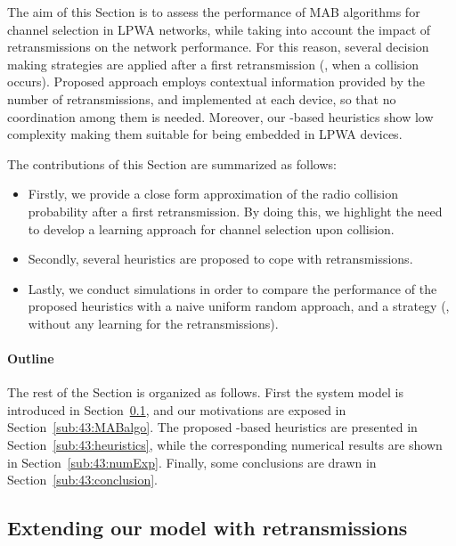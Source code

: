 The aim of this Section is to assess the performance of MAB algorithms for channel selection in LPWA networks, while taking into account the impact of retransmissions on the network performance.
For this reason, several decision making strategies are applied after a first retransmission (\ie, when a collision occurs).
Proposed approach employs contextual information provided by the number of retransmissions, and implemented at each device, so that no coordination among them is needed.
Moreover, our \UCB{}-based heuristics show low complexity making them suitable for being embedded in LPWA devices.

The contributions of this Section are summarized as follows:
\begin{itemize}
	\item
	Firstly, we provide a close form approximation of the radio collision probability after a first retransmission.
	By doing this, we highlight the need to develop a learning approach for channel selection upon collision.

	\item
	Secondly, several heuristics are proposed to cope with retransmissions.

	\item Lastly, we conduct simulations in order to compare the performance of the proposed heuristics with a naive uniform random approach, and a \UCB{} strategy (\ie, without any learning for the retransmissions).
\end{itemize}


\paragraph{Outline}

The rest of the Section is organized as follows.
First the system model is introduced in Section~\ref{sub:43:model},
and our motivations are exposed in Section~\ref{sub:43:MABalgo}.
The proposed \UCB-based heuristics are presented in Section~\ref{sub:43:heuristics}, while the corresponding numerical results are shown in Section~\ref{sub:43:numExp}.
Finally, some conclusions are drawn in Section~\ref{sub:43:conclusion}.


\subsection{Extending our model with retransmissions}
\label{sub:43:model}

